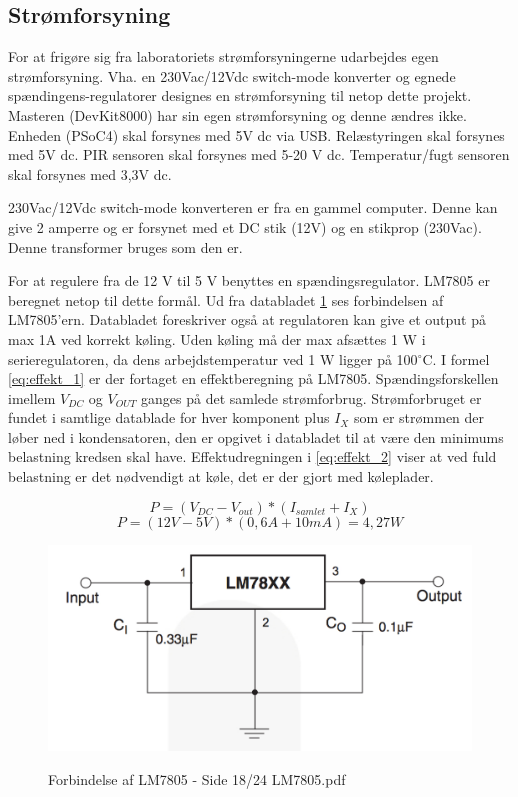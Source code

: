 \subsection{Strømforsyning}

For at frigøre sig fra laboratoriets strømforsyningerne udarbejdes egen strømforsyning. Vha. en 230Vac/12Vdc switch-mode konverter og egnede spændingens-regulatorer designes en strømforsyning til netop dette projekt. Masteren (DevKit8000) har sin egen strømforsyning og denne ændres ikke. Enheden (PSoC4) skal forsynes med 5V dc via USB. Relæstyringen skal forsynes med 5V dc. PIR sensoren skal forsynes med 5-20 V dc. Temperatur/fugt sensoren skal forsynes med 3,3V dc. 

230Vac/12Vdc switch-mode konverteren er fra en gammel computer. Denne kan give 2 amperre og er forsynet med et DC stik (12V) og en stikprop (230Vac). Denne transformer bruges som den er. 

For at regulere fra de 12 V til 5 V benyttes en spændingsregulator. LM7805 er beregnet netop til dette formål. Ud fra databladet \ref{lab:LM7805} ses forbindelsen af LM7805'ern. Databladet foreskriver også at regulatoren kan give et output på max 1A ved korrekt køling.  
\newline
Uden køling må der max afsættes 1 W i serieregulatoren, da dens arbejdstemperatur ved 1 W ligger på 100$^{\circ}$C.  I formel \ref{eq:effekt_1} er der fortaget en effektberegning på LM7805. Spændingsforskellen imellem $V_{DC}$ og $V_{OUT}$ ganges på det samlede strømforbrug. Strømforbruget er fundet i samtlige datablade for hver komponent plus $I_X$ som er strømmen der løber ned i kondensatoren, den er opgivet i databladet til at være den minimums belastning kredsen skal have. Effektudregningen i \ref{eq:effekt_2} viser at ved fuld belastning er det nødvendigt at køle, det er der gjort med køleplader. 

\begin{equation} 
P = (V_{DC}-V_{out})*(I_{samlet}+I_X) 
\label{eq:effekt_1}
\end{equation}
\begin{equation} 
P = (12V - 5V)*(0,6 A +10 mA)= 4,27 W 
\label{eq:effekt_2}
\end{equation}

\begin{figure}[H] \centering
{\includegraphics[width=\textwidth]{filer/design/Billeder/LM7805_DATASHEET}}
\caption{Forbindelse af LM7805 - Side 18/24 LM7805.pdf}
\label{lab:LM7805}
\raggedright
\end{figure}

